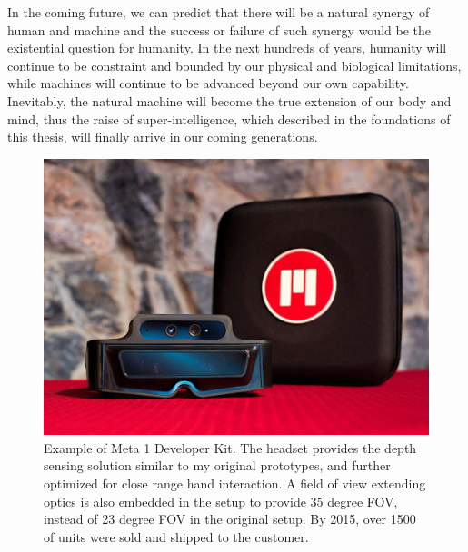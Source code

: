 In the coming future, we can predict that there will be a natural synergy of human and machine and the success or failure of such synergy would be the existential question for humanity. In the next hundreds of years, humanity will continue to be constraint and bounded by our physical and biological limitations, while machines will continue to be advanced beyond our own capability. Inevitably, the natural machine will become the true extension of our body and mind, thus the raise of super-intelligence, which described in the foundations of this thesis, will finally arrive in our coming generations.
\begin{figure}
\center
 \includegraphics[width=5in]{ch7/figures/small_meta_1_developer_kit.jpg}
 \caption{Example of Meta 1 Developer Kit. The headset provides the depth sensing solution similar to my original prototypes, and further optimized for close range hand interaction. A field of view extending optics is also embedded in the setup to provide 35 degree FOV, instead of 23 degree FOV in the original setup. By 2015, over 1500 of units were sold and shipped to the customer.}
 \label{fig:meta1}
\end{figure}


